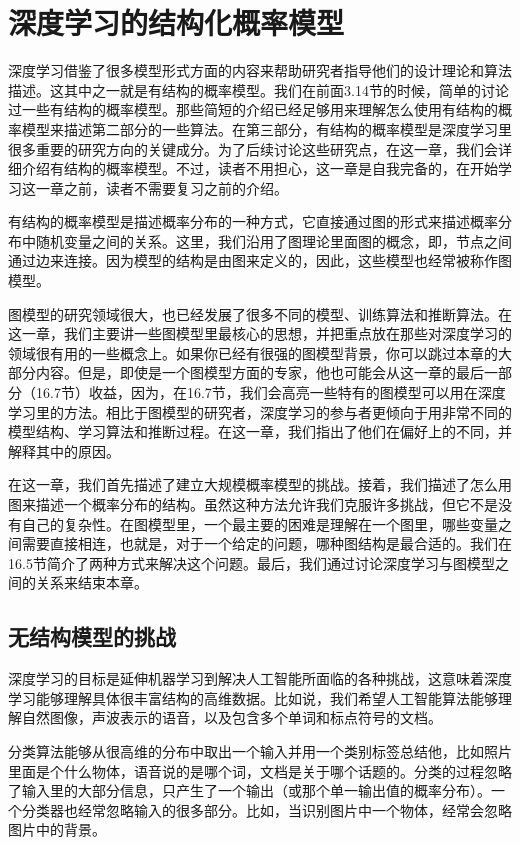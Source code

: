 \chapter{深度学习的结构化概率模型}
\label{chap:16}
深度学习借鉴了很多模型形式方面的内容来帮助研究者指导他们的设计理论和算法描述。这其中之一就是有结构的概率模型。我们在前面3.14节的时候，简单的讨论过一些有结构的概率模型。那些简短的介绍已经足够用来理解怎么使用有结构的概率模型来描述第二部分的一些算法。在第三部分，有结构的概率模型是深度学习里很多重要的研究方向的关键成分。为了后续讨论这些研究点，在这一章，我们会详细介绍有结构的概率模型。不过，读者不用担心，这一章是自我完备的，在开始学习这一章之前，读者不需要复习之前的介绍。

有结构的概率模型是描述概率分布的一种方式，它直接通过图的形式来描述概率分布中随机变量之间的关系。这里，我们沿用了图理论里面图的概念，即，节点之间通过边来连接。因为模型的结构是由图来定义的，因此，这些模型也经常被称作图模型。

图模型的研究领域很大，也已经发展了很多不同的模型、训练算法和推断算法。在这一章，我们主要讲一些图模型里最核心的思想，并把重点放在那些对深度学习的领域很有用的一些概念上。如果你已经有很强的图模型背景，你可以跳过本章的大部分内容。但是，即使是一个图模型方面的专家，他也可能会从这一章的最后一部分（16.7节）收益，因为，在16.7节，我们会高亮一些特有的图模型可以用在深度学习里的方法。相比于图模型的研究者，深度学习的参与者更倾向于用非常不同的模型结构、学习算法和推断过程。在这一章，我们指出了他们在偏好上的不同，并解释其中的原因。

在这一章，我们首先描述了建立大规模概率模型的挑战。接着，我们描述了怎么用图来描述一个概率分布的结构。虽然这种方法允许我们克服许多挑战，但它不是没有自己的复杂性。在图模型里，一个最主要的困难是理解在一个图里，哪些变量之间需要直接相连，也就是，对于一个给定的问题，哪种图结构是最合适的。我们在16.5节简介了两种方式来解决这个问题。最后，我们通过讨论深度学习与图模型之间的关系来结束本章。

\section{无结构模型的挑战}
深度学习的目标是延伸机器学习到解决人工智能所面临的各种挑战，这意味着深度学习能够理解具体很丰富结构的高维数据。比如说，我们希望人工智能算法能够理解自然图像，声波表示的语音，以及包含多个单词和标点符号的文档。

分类算法能够从很高维的分布中取出一个输入并用一个类别标签总结他，比如照片里面是个什么物体，语音说的是哪个词，文档是关于哪个话题的。分类的过程忽略了输入里的大部分信息，只产生了一个输出（或那个单一输出值的概率分布）。一个分类器也经常忽略输入的很多部分。比如，当识别图片中一个物体，经常会忽略图片中的背景。

